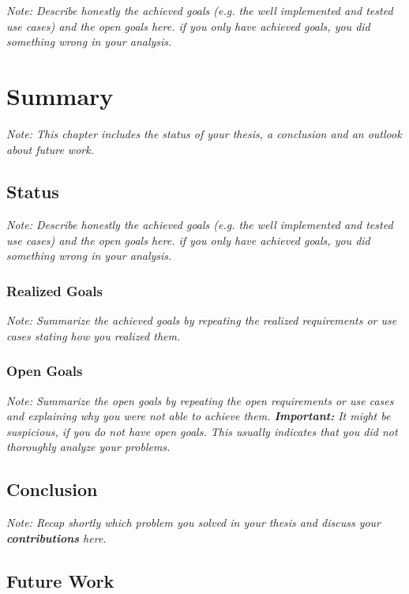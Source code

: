 \documentclass[a4paper,12pt,twoside]{report}
\begin{document}
\textit{Note: Describe honestly the achieved goals (e.g. the well implemented and tested use cases) and the open goals here. if you only have achieved goals, you did something wrong in your analysis.}


\chapter{Summary}

\textit{Note: This chapter includes the status of your thesis, a conclusion and an outlook about future work.}

\section{Status}

\textit{Note: Describe honestly the achieved goals (e.g. the well implemented and tested use cases) and the open goals here. if you only have achieved goals, you did something wrong in your analysis.}

\subsection{Realized Goals}

\textit{Note: Summarize the achieved goals by repeating the realized requirements or use cases stating how you realized them.}

\subsection{Open Goals}

\textit{Note: Summarize the open goals by repeating the open requirements or use cases and explaining why you were not able to achieve them. \textbf{Important:} It might be suspicious, if you do not have open goals. This usually indicates that you did not thoroughly analyze your problems.}

\section{Conclusion}

\textit{Note: Recap shortly which problem you solved in your thesis and discuss your \textbf{contributions} here.}

\section{Future Work}
\end{document}
